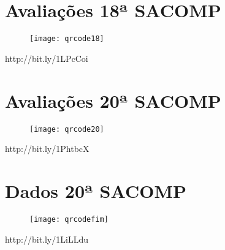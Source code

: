 \documentclass[tcc,capa]{texufpel}
\begin{document}
    
\chapter{Avaliações 18ª SACOMP}
\label{anexoB}
    
    \begin{figure}[H]
     \centering \texttt{[image: qrcode18]}
    \end{figure}
    \centering  http://bit.ly/1LPcCoi

\chapter{Avaliações 20ª SACOMP}
\label{anexoC}
   
    
    \begin{figure}[H]
        \centering \texttt{[image: qrcode20]}
    \end{figure}
     \centering http://bit.ly/1PhtbcX

\chapter{Dados 20ª SACOMP}
\label{anexoD}
    \begin{figure}[H]
        \centering \texttt{[image: qrcodefim]}
    \end{figure}

\centering http://bit.ly/1LiLLdu
\end{document}
